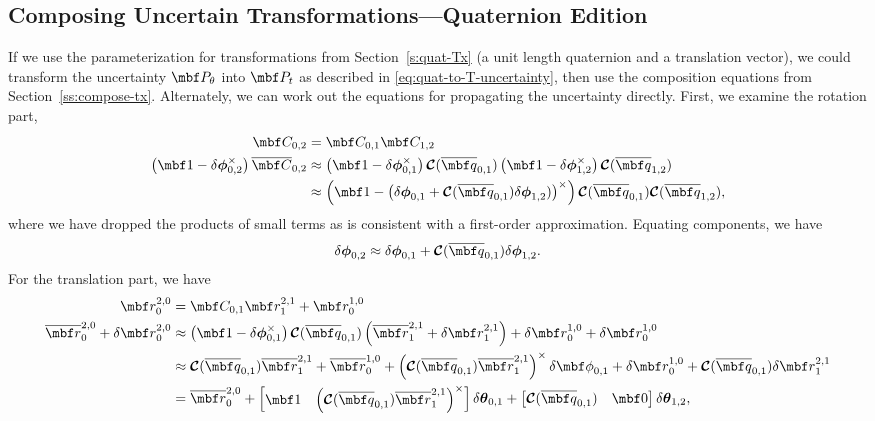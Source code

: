 \documentclass[11pt,a4,oneside]{article}
\begin{document}
\subsection{Composing Uncertain Transformations---Quaternion Edition \label{ss:Tquat-uncertainty}}
If we use the parameterization for transformations from Section~\ref{s:quat-Tx} (a unit length quaternion and a translation vector), we could transform the uncertainty $\mbf P_{\theta}$ into $\mbf P_t$ as described in \eqref{eq:quat-to-T-uncertainty}, then use the composition equations from Section~\ref{ss:compose-tx}. Alternately, we can work out the equations for propagating the uncertainty directly.
First, we examine the rotation part,
\begin{subequations}
  \label{eq:q-T-uncertainty}
  \begin{flalign}
    \mbf C_{0,2} & = \mbf C_{0,1} \mbf C_{1,2}\\
    \left(\mbf 1 - \mbsdel \phi_{0,2}^{\times}\right) \mbfbar C_{0,2} 
    & \approx  
    \left( \mbf 1 - \mbsdel \phi_{0,1}^\times \right) \mbc C(\mbfbar q_{0,1}) \left( \mbf 1 - \mbsdel \phi_{1,2}^\times \right) \mbc C(\mbfbar q_{1,2}) \\
& \approx 
    \left( \mbf 1 - \left(\mbsdel \phi_{0,1} + \mbc C(\mbfbar q_{0,1}) \mbsdel \phi_{1,2})\right)^\times \right) \mbc C(\mbfbar q_{0,1})\mbc C(\mbfbar q_{1,2}),
  \end{flalign}
\end{subequations}
where we have dropped the products of small terms as is consistent with a first-order approximation. Equating components, we have
\begin{equation}
  \label{eq:quat-rot-uncertainty}
  \mbsdel \phi_{0,2} \approx \mbsdel \phi_{0,1} + \mbc C(\mbfbar q_{0,1}) \mbsdel \phi_{1,2}.
\end{equation}
For the translation part, we have
\begin{subequations}
  \label{eq:eq-quat-tran-uncertainty}
  \begin{flalign}
    \mbf r_{0}^{2,0} &= \mbf C_{0,1} \mbf r_{1}^{2,1} + \mbf r_{0}^{1,0}\\
    \mbfbar r_{0}^{2,0} + \mbfdel r_{0}^{2,0} & \approx \left( \mbf 1 - \mbsdel \phi_{0,1}^\times \right) \mbc C(\mbfbar q_{0,1}) \left(\mbfbar r_{1}^{2,1} + \mbfdel r_{1}^{2,1}\right) + \mbfdel r_{0}^{1,0} + \mbfdel r_{0}^{1,0}\\
    & \approx \mbc C(\mbfbar q_{0,1}) \mbfbar r_{1}^{2,1} + \mbfbar r_{0}^{1,0} + \left(\mbc C(\mbfbar q_{0,1}) \mbfbar r_{1}^{2,1}\right)^\times \mbfdel \phi_{0,1} + \mbfdel r_{0}^{1,0} + \mbc C(\mbfbar q_{0,1}) \mbfdel r_{1}^{2,1}\\
& = \mbfbar r_{0}^{2,0}     +
    \bbm
      \mbf 1 & \left( \mbc C(\mbfbar q_{0,1}) \mbfbar r_{1}^{2,1} \right)^\times
    \ebm
    \mbsdel \theta_{0,1}
    +
    \bbm 
       \mbc C(\mbfbar q_{0,1}) & \mbf 0
    \ebm
    \mbsdel \theta_{1,2},
  \end{flalign}
\end{subequations}
\end{document}
